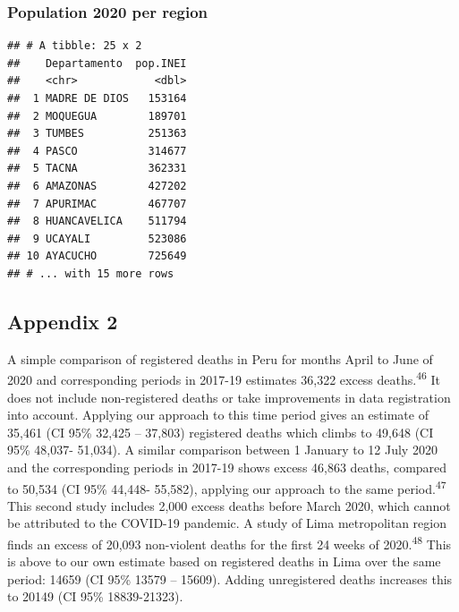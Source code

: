 \documentclass[
]{article}
\begin{document}
\hypertarget{population-2020-per-region}{%
\subsubsection{Population 2020 per region}\label{population-2020-per-region}}

\begin{verbatim}
## # A tibble: 25 x 2
##    Departamento  pop.INEI
##    <chr>            <dbl>
##  1 MADRE DE DIOS   153164
##  2 MOQUEGUA        189701
##  3 TUMBES          251363
##  4 PASCO           314677
##  5 TACNA           362331
##  6 AMAZONAS        427202
##  7 APURIMAC        467707
##  8 HUANCAVELICA    511794
##  9 UCAYALI         523086
## 10 AYACUCHO        725649
## # ... with 15 more rows
\end{verbatim}

\hypertarget{appendix-2}{%
\subsection{Appendix 2}\label{appendix-2}}

A simple comparison of registered deaths in Peru for months April to June of 2020 and corresponding periods in 2017-19 estimates 36,322 excess deaths.\textsuperscript{46} It does not include non-registered deaths or take improvements in data registration into account. Applying our approach to this time period gives an estimate of 35,461 (CI 95\% 32,425 -- 37,803) registered deaths which climbs to 49,648 (CI 95\% 48,037- 51,034). A similar comparison between 1 January to 12 July 2020 and the corresponding periods in 2017-19 shows excess 46,863 deaths, compared to 50,534 (CI 95\% 44,448- 55,582), applying our approach to the same period.\textsuperscript{47} This second study includes 2,000 excess deaths before March 2020, which cannot be attributed to the COVID-19 pandemic. A study of Lima metropolitan region finds an excess of 20,093 non-violent deaths for the first 24 weeks of 2020.\textsuperscript{48} This is above to our own estimate based on registered deaths in Lima over the same period: 14659 (CI 95\% 13579 -- 15609). Adding unregistered deaths increases this to 20149 (CI 95\% 18839-21323).
\end{document}

